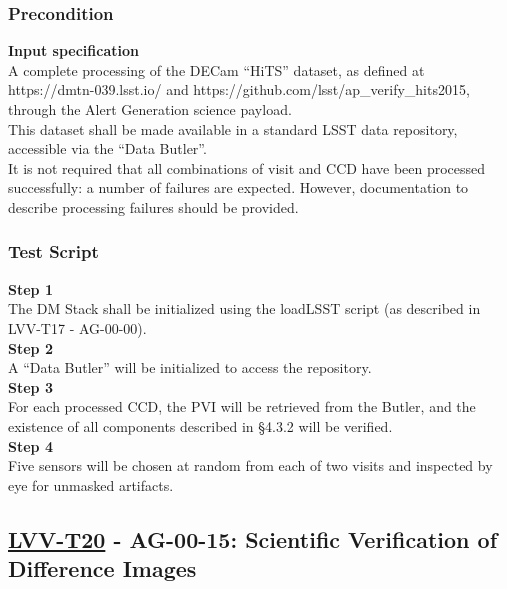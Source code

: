 \subsubsection{Precondition}\label{precondition-2}

\textbf{Input specification}\\[2\baselineskip]A complete processing of
the DECam ``HiTS'' dataset, as defined at https://dmtn-039.lsst.io/ and
https://github.com/lsst/ap\_verify\_hits2015, through the Alert
Generation science payload.\\
This dataset shall be made available in a standard LSST data repository,
accessible via the ``Data Butler''.\\
It is not required that all combinations of visit and CCD have been
processed successfully: a number of failures are expected. However,
documentation to describe processing failures should be provided.

\subsubsection{Test Script}\label{test-script-2}

\textbf{Step 1}\\
The DM Stack shall be initialized using the loadLSST script (as
described in LVV-T17 - AG-00-00).\\[2\baselineskip]\textbf{Step 2}\\
A ``Data Butler'' will be initialized to access the
repository.\\[2\baselineskip]\textbf{Step 3}\\
For each processed CCD, the PVI will be retrieved from the Butler, and
the existence of all components described in §4.3.2 will be
verified.\\[2\baselineskip]\textbf{Step 4}\\
Five sensors will be chosen at random from each of two visits and
inspected by eye for unmasked artifacts.\\[2\baselineskip]

\hypertarget{lvv-t20---ag-00-15-scientific-verification-of-difference-images}{\subsection{\texorpdfstring{\href{https://jira.lsstcorp.org/secure/Tests.jspa\#/testCase/LVV-T20}{LVV-T20}
- AG-00-15: Scientific Verification of Difference
Images}{LVV-T20 - AG-00-15: Scientific Verification of Difference Images}}\label{lvv-t20---ag-00-15-scientific-verification-of-difference-images}}

